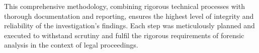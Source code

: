 This comprehensive methodology, combining rigorous technical processes with thorough documentation and reporting, ensures the highest level of integrity and reliability of the investigation's findings. Each step was meticulously planned and executed to withstand scrutiny and fulfil the rigorous requirements of forensic analysis in the context of legal proceedings.
